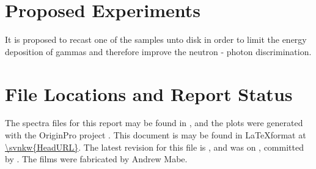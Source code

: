 \documentclass[draftcls,onecolumn]{IEEEtran}
\begin{document}
\section{Proposed Experiments}
It is proposed to recast one of the samples unto disk in order to limit the energy deposition of gammas and therefore improve the neutron - photon discrimination.
\pagebreak
\appendices
\section{}
\section{File Locations and Report Status}
The spectra files for this report may be found in , and the plots were generated with the OriginPro project .
This document is may be found in \LaTeX format at \url{\svnkw{HeadURL}}.  
The latest revision for this file is \svnrev, and was on \svndate, committed by \svnauthor.
The films were fabricated by Andrew Mabe.
\end{document}
